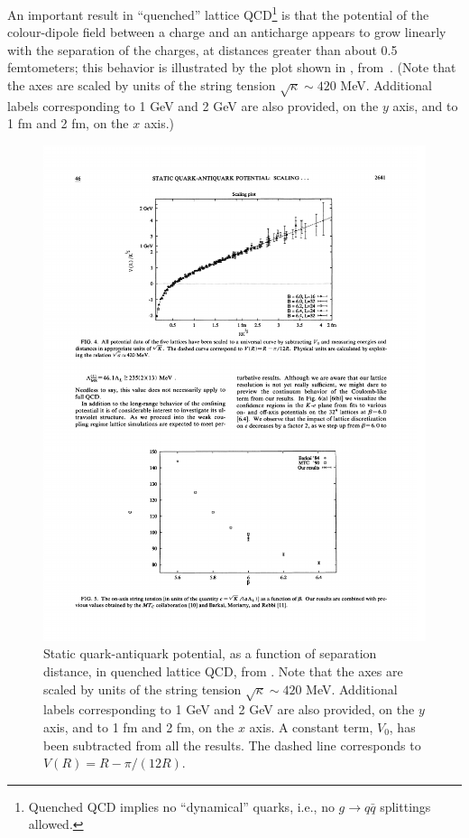 %
%
An important result in ``quenched'' lattice
QCD\footnote{Quenched QCD implies no ``dynamical'' quarks, i.e., no
  $g\to q\bar{q}$ splittings  allowed.} is that the potential
of the colour-dipole field between a charge and an anticharge 
appears to grow linearly with the separation of the charges, at
distances greater than about 0.5 femtometers; this behavior is
illustrated by the plot shown in 
, from~\cite{Bali:1992ab}. (Note that the axes are
scaled by units of the string tension $\sqrt{\kappa}\sim 420$
MeV. Additional labels corresponding to 1 GeV and 2 GeV are also
provided, on the $y$ axis, and to 1 fm and 2 fm, on the $x$ axis.)  
\begin{figure}[t]
\centering\includegraphics*[scale=0.86]{linearpotential.pdf}
\caption{Static quark-antiquark potential, as a function of separation 
  distance, in quenched lattice QCD, from 
\cite{Bali:1992ab}\label{fig:linear}. Note that the axes are
scaled by units of the string tension $\sqrt{\kappa}\sim 420$
MeV. Additional labels corresponding to 1 GeV and 2 GeV are also
provided, on the $y$ axis, and to 1 fm and 2 fm, on the $x$ axis.
A constant term, $V_0$, has been subtracted from all the results. 
The dashed line corresponds to $V(R) = R - \pi/(12R)$.}
\end{figure}
